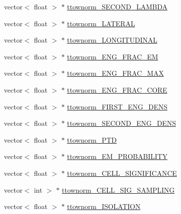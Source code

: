 \begin{DoxyCompactItemize}
\item 
vector$<$ float $>$ $\ast$ \hyperlink{classJetAnalysisExample_a25d960fd69e545bcf381e927ecb5ea62}{ttownorm\+\_\+\+S\+E\+C\+O\+N\+D\+\_\+\+L\+A\+M\+B\+DA}
\item 
vector$<$ float $>$ $\ast$ \hyperlink{classJetAnalysisExample_a682bce2595cb94d90f2e6bcb3258ac78}{ttownorm\+\_\+\+L\+A\+T\+E\+R\+AL}
\item 
vector$<$ float $>$ $\ast$ \hyperlink{classJetAnalysisExample_a77e79395e17d6e0173aee058d5600bf5}{ttownorm\+\_\+\+L\+O\+N\+G\+I\+T\+U\+D\+I\+N\+AL}
\item 
vector$<$ float $>$ $\ast$ \hyperlink{classJetAnalysisExample_abedd1665b31b9a0f1cb83d5523c62007}{ttownorm\+\_\+\+E\+N\+G\+\_\+\+F\+R\+A\+C\+\_\+\+EM}
\item 
vector$<$ float $>$ $\ast$ \hyperlink{classJetAnalysisExample_ac723a12fd58ff7c76f4bcd5d92038e39}{ttownorm\+\_\+\+E\+N\+G\+\_\+\+F\+R\+A\+C\+\_\+\+M\+AX}
\item 
vector$<$ float $>$ $\ast$ \hyperlink{classJetAnalysisExample_a829d9b97ee35b11dfce295869df19761}{ttownorm\+\_\+\+E\+N\+G\+\_\+\+F\+R\+A\+C\+\_\+\+C\+O\+RE}
\item 
vector$<$ float $>$ $\ast$ \hyperlink{classJetAnalysisExample_ad561e25720196ddf6bc2ef7e01318af8}{ttownorm\+\_\+\+F\+I\+R\+S\+T\+\_\+\+E\+N\+G\+\_\+\+D\+E\+NS}
\item 
vector$<$ float $>$ $\ast$ \hyperlink{classJetAnalysisExample_a2930268b022ee2c3df4c9f95f2a97676}{ttownorm\+\_\+\+S\+E\+C\+O\+N\+D\+\_\+\+E\+N\+G\+\_\+\+D\+E\+NS}
\item 
vector$<$ float $>$ $\ast$ \hyperlink{classJetAnalysisExample_a6c0536ac9ac18a632580c1c6d7bbc885}{ttownorm\+\_\+\+P\+TD}
\item 
vector$<$ float $>$ $\ast$ \hyperlink{classJetAnalysisExample_a57591a4bb49e11c3a7abf81086ca4b80}{ttownorm\+\_\+\+E\+M\+\_\+\+P\+R\+O\+B\+A\+B\+I\+L\+I\+TY}
\item 
vector$<$ float $>$ $\ast$ \hyperlink{classJetAnalysisExample_a6e137b5ff2257d6bdb227082f66b764f}{ttownorm\+\_\+\+C\+E\+L\+L\+\_\+\+S\+I\+G\+N\+I\+F\+I\+C\+A\+N\+CE}
\item 
vector$<$ int $>$ $\ast$ \hyperlink{classJetAnalysisExample_a50f0368a3d79076412579b0158a42394}{ttownorm\+\_\+\+C\+E\+L\+L\+\_\+\+S\+I\+G\+\_\+\+S\+A\+M\+P\+L\+I\+NG}
\item 
vector$<$ float $>$ $\ast$ \hyperlink{classJetAnalysisExample_ae00a263a6e5a9384ccbf4b4580d3324e}{ttownorm\+\_\+\+I\+S\+O\+L\+A\+T\+I\+ON}
\item 

\end{DoxyCompactItemize}
